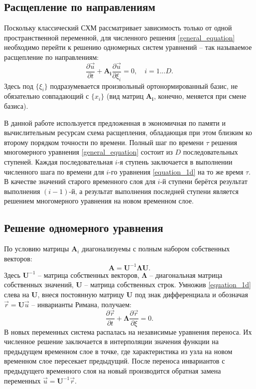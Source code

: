 \documentclass[a4paper]{article}
\numberwithin{equation}{section}
\begin{document}
\subsection{Расщепление по направлениям}
Поскольку классический СХМ \cite{magomedov_kholodov_1988} 
рассматривает зависимость только от одной пространственной переменной,
для численного решения \eqref{general_equation} необходимо
перейти к решению одномерных систем уравнений -- так называемое расщепление по направлениям:
\begin{equation}
\label{equation_1d}
	\frac{\partial\vec{u}}{\partial{t}}+\mathbf{A_i}\frac{\partial\vec{u}}{\partial{\xi_i}} = 0, \quad i = 1 ... D.
\end{equation}
Здесь под $\{\xi_i\}$ подразумевается произвольный ортонормированный базис, 
не обязательно совпадающий с $\{x_i\}$ 
(вид матриц $\mathbf{A_i}$, конечно, меняется при смене базиса).

В данной работе используется предложенная в \cite{chelnokov}
экономичная по памяти и вычислительным ресурсам схема расщепления, 
обладающая при этом близким ко второму порядком точности по времени.
Полный шаг по времени $\tau$ решения многомерного уравнения \eqref{general_equation} 
состоит из $D$ последовательных ступеней. 
Каждая последовательная $i$-я ступень заключается в выполнении численного шага по времени
для $i$-го уравнения \eqref{equation_1d} на то же время $\tau$. 
В качестве значений старого временного слоя для $i$-й ступени 
берётся результат выполнения $(i-1)$-й, 
а результат выполнения последней ступени является решением 
многомерного уравнения на новом временном слое. 


\subsection{Решение одномерного уравнения}
По условию матрицы $\mathbf{A}_i$ диагонализуемы с полным набором собственных векторов:
\begin{equation}
	\label{diagonal_view}
	\mathbf{A} = \mathbf{U}^{-1}\mathbf{\Lambda}\mathbf{U}.
\end{equation}
Здесь $\mathbf{U}^{-1}$ -- матрица собственных векторов, 
$\mathbf{\Lambda}$ -- диагональная матрица собственных значений,
$\mathbf{U}$ -- матрица собственных строк.
Умножив \eqref{equation_1d} слева на $\mathbf{U}$, 
внеся постоянную матрицу $\mathbf{U}$ под знак дифференциала
и обозначая $\vec{r} = \mathbf{U}\vec{u}$ -- инварианты Римана, получаем:
\begin{equation}
	\label{in_riemann_invariants}
	\frac{\partial\vec{r}}{\partial{t}}+\mathbf{\Lambda}\frac{\partial\vec{r}}{\partial{\xi}} = 0.
\end{equation}
В новых переменных система распалась на независимые уравнения переноса.
Их численное решение заключается в интерполяции значения функции
на предыдущем временном слое в точке, где характеристика из узла 
на новом временном слое пересекает предыдущий. 
После переноса инвариантов с предыдущего временного слоя на новый
производится обратная замена переменных $\vec{u} = \mathbf{U}^{-1}\vec{r}$.
\end{document}
